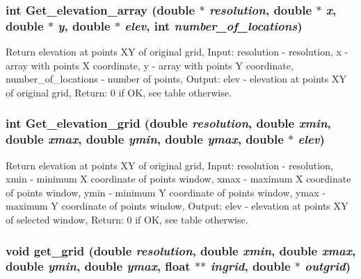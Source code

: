 \hypertarget{GisApi_8C_a75}{
\subsubsection[Get\_\-elevation\_\-array]{\setlength{\rightskip}{0pt plus 5cm}int Get\_\-elevation\_\-array (double $\ast$ {\em resolution}, double $\ast$ {\em x}, double $\ast$ {\em y}, double $\ast$ {\em elev}, int {\em number\_\-of\_\-locations})}}
\label{GisApi_8C_a75}


Return elevation at points XY of original grid, Input: resolution - resolution, x - array with points X coordinate, y - array with points Y coordinate, number\_\-of\_\-locations - number of points, Output: elev - elevation at points XY of original grid, Return: 0 if OK, see table otherwise. 

\hypertarget{GisApi_8C_a78}{
\subsubsection[Get\_\-elevation\_\-grid]{\setlength{\rightskip}{0pt plus 5cm}int Get\_\-elevation\_\-grid (double {\em resolution}, double {\em xmin}, double {\em xmax}, double {\em ymin}, double {\em ymax}, double $\ast$ {\em elev})}}
\label{GisApi_8C_a78}


Return elevation at points XY of original grid, Input: resolution - resolution, xmin - minimum X coordinate of points window, xmax - maximum X coordinate of points window, ymin - minimum Y coordinate of points window, ymax - maximum Y coordinate of points window, Output: elev - elevation at points XY of selected window, Return: 0 if OK, see table otherwise. 

\hypertarget{GisApi_8C_a16}{
\subsubsection[get\_\-grid]{\setlength{\rightskip}{0pt plus 5cm}void get\_\-grid (double {\em resolution}, double {\em xmin}, double {\em xmax}, double {\em ymin}, double {\em ymax}, float $\ast$$\ast$ {\em ingrid}, double $\ast$ {\em outgrid})}}
\label{GisApi_8C_a16}



